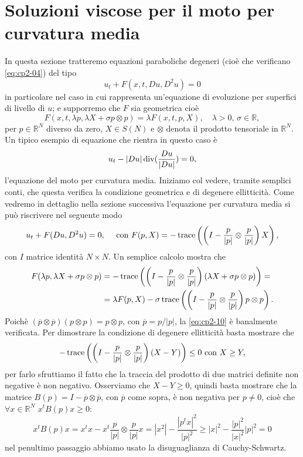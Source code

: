 \section{Soluzioni viscose per il moto per curvatura media}
In questa sezione tratteremo equazioni paraboliche degeneri (cioè che verificano \eqref{eq:cp2-04}) del tipo
\begin{equation}
  \label{eq:cp2-09}
u_t + F(x,t,Du,D^2u) = 0
\end{equation}
in particolare nel caso in cui rappresenta un'equazione di evoluzione per superfici di livello di $u$; e supporremo che $F$ sia geometrica cioè
\begin{equation}
  \label{eq:cp2-10}
F(x,t,\lambda p,\lambda X + \sigma p\otimes p) = \lambda F(x,t,p,X),\quad\lambda>0,\,\sigma\in\mathbb{R},
\end{equation}
per $p\in\mathbb{R}^N$ diverso da zero, $X\in S(N)$ e $\otimes$ denota il prodotto tensoriale in $\mathbb{R}^N$. Un tipico esempio di equazione che rientra in questo caso è
\[
u_t - |Du|\operatorname{div}(\frac{Du}{|Du|}) = 0,
\]
l'equazione del moto per curvatura media. Iniziamo col vedere, tramite semplici conti, che questa verifica la condizione geometrica e di degenere ellitticità.
Come vedremo in dettaglio nella sezione successiva l'equazione per curvatura media si può riscrivere nel seguente modo
\[
u_t+F(Du,D^2u)=0,\quad\text{ con }F(p,X) = -\operatorname{trace}\left(\left(I-\frac{p}{|p|}\otimes\frac{p}{|p|}\right)X\right),
\]
con $I$ matrice identità $N\times N$.
Un semplice calcolo mostra che
\[
\begin{aligned}
F(\lambda p,\lambda X +\sigma p\otimes p)&=-\operatorname{trace}\left(\left(I-\frac{p}{|p|}\otimes\frac{p}{|p|}\right)\left(\lambda X+\sigma p\otimes p\right)\right)=\\
&=\lambda F(p,X)-\sigma\operatorname{trace}\left(\left(I-\frac{p}{|p|}\otimes\frac{p}{|p|}\right)p\otimes p\right).
\end{aligned}
\]
Poichè $(\overline{p}\otimes\overline{p})(p\otimes p)=p\otimes p$, con $\overline{p}=p/|p|$, la \eqref{eq:cp2-10} è banalmente verificata. Per dimostrare la condizione di degenere ellitticità basta mostrare che
\[
-\operatorname{trace}\left(\left(I-\frac{p}{|p|}\otimes\frac{p}{|p|}\right)\left(X-Y\right)\right)\leq 0\text{ con }X\geq Y,
\]
per farlo sfruttiamo il fatto che la traccia del prodotto di due matrici definite non negative è non negativo. Osserviamo che $X-Y\geq 0$, quindi basta mostrare che la matrice $B(p)= I-\overline{p}\otimes\overline{p}$, con $\overline{p}$ come sopra, è non negativa per $p\ne 0$, cioè che $\forall x\in\mathbb{R}^N$ $x^tB(p)x\geq 0$:
\[
x^tB(p)x=x^tx-x^t\frac{p}{|p|}\otimes\frac{p}{|p|}x=|x^2|-\frac{|p^tx|^2}{|p|^2}\geq |x|^2-\frac{|p|^2}{|x|^2}{|p|^2}=0
\]
nel penultimo passaggio abbiamo usato la disuguaglianza di Cauchy-Schwartz.

